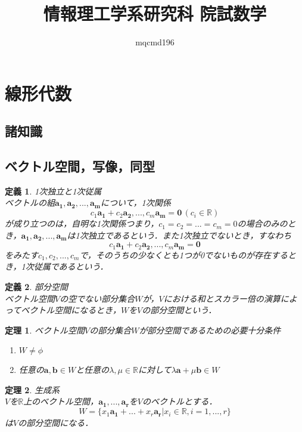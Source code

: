 \documentclass[uplatex]{jsarticle}
\title{情報理工学系研究科 院試数学}
\author{mqcmd196}
\newtheorem{definition}{定義}
\newtheorem{theorem}{定理}
\begin{document}
\section{線形代数}

\subsection{諸知識}

\subsection{ベクトル空間，写像，同型}
\begin{definition}
    \label{def:1次独立と1次従属}
    1次独立と1次従属\\
    ベクトルの組$\bm{a_1}, \bm{a_2}, ..., \bm{a_m}$について，1次関係$$c_1\bm{a_1} + c_2\bm{a_2}, ..., c_m\bm{a_m} = \bm{0} \, (c_i \in \mathbb{R})$$が成り立つのは，自明な1次関係つまり，$c_1 = c_2 = ... = c_m = 0$の場合のみのとき，$\bm{a_1}, \bm{a_2}, ..., \bm{a_m}$は1次独立であるという．また1次独立でないとき，すなわち$$c_1\bm{a_1} + c_2\bm{a_2}, ..., c_m\bm{a_m} = \bm{0}$$をみたす$c_1, c_2, ..., c_m$で，そのうちの少なくとも1つが0でないものが存在するとき，1次従属であるという．
\end{definition}

\begin{definition}
    部分空間\\
    ベクトル空間$V$の空でない部分集合$W$が，$V$における和とスカラー倍の演算によってベクトル空間になるとき，$W$を$V$の部分空間という．
\end{definition}

\begin{theorem}
    ベクトル空間$V$の部分集合$W$が部分空間であるための必要十分条件
    \begin{enumerate}
        \item $W \neq \phi$
        \item 任意の$\bm{a}, \bm{b} \in W$と任意の$\lambda, \mu \in \mathbb{R}$に対して$\lambda\bm{a} + \mu\bm{b} \in W$
    \end{enumerate}
\end{theorem}

\begin{theorem}
    \label{thm:生成系}
    生成系\\
    $V$を$\mathbb{R}$上のベクトル空間，$\bm{a_1}, ..., \bm{a_r}$を$V$のベクトルとする．$$W = \{x_1\bm{a_1} + ... + x_r\bm{a_r} | x_i \in \mathbb{R}, i = 1, ... , r\}$$は$V$の部分空間になる．
\end{theorem}
\end{document}
